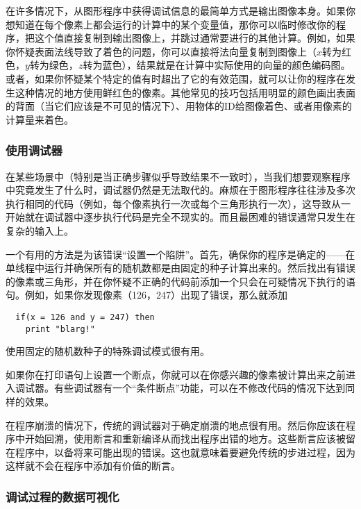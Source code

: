 \documentclass[lang=cn,12pt]{elegantbook}
\begin{document}
在许多情况下，从图形程序中获得调试信息的最简单方式是输出图像本身。如果你想知道在每个像素上都会运行的计算中的某个变量值，那你可以临时修改你的程序，把这个值直接复制到输出图像上，并跳过通常要进行的其他计算。例如，如果你怀疑表面法线导致了着色的问题，你可以直接将法向量复制到图像上（$x$转为红色，$y$转为绿色，$z$转为蓝色），结果就是在计算中实际使用的向量的颜色编码图。或者，如果你怀疑某个特定的值有时超出了它的有效范围，就可以让你的程序在发生这种情况的地方使用鲜红色的像素。其他常见的技巧包括用明显的颜色画出表面的背面（当它们应该是不可见的情况下）、用物体的ID给图像着色、或者用像素的计算量来着色。

\subsubsection{使用调试器}

在某些场景中（特别是当正确步骤似乎导致结果不一致时），当我们想要观察程序中究竟发生了什么时，调试器仍然是无法取代的。麻烦在于图形程序往往涉及多次执行相同的代码（例如，每个像素执行一次或每个三角形执行一次），这导致从一开始就在调试器中逐步执行代码是完全不现实的。而且最困难的错误通常只发生在复杂的输入上。

一个有用的方法是为该错误“设置一个陷阱”。首先，确保你的程序是确定的——在单线程中运行并确保所有的随机数都是由固定的种子计算出来的。然后找出有错误的像素或三角形，并在你怀疑不正确的代码前添加一个只会在可疑情况下执行的语句。例如，如果你发现像素（126，247）出现了错误，那么就添加

\begin{lstlisting}
  if(x = 126 and y = 247) then
    print "blarg!"
\end{lstlisting}

\begin{note}
使用固定的随机数种子的特殊调试模式很有用。
\end{note}

如果你在打印语句上设置一个断点，你就可以在你感兴趣的像素被计算出来之前进入调试器。有些调试器有一个“条件断点”功能，可以在不修改代码的情况下达到同样的效果。

在程序崩溃的情况下，传统的调试器对于确定崩溃的地点很有用。然后你应该在程序中开始回溯，使用断言和重新编译从而找出程序出错的地方。这些断言应该被留在程序中，以备将来可能出现的错误。这也就意味着要避免传统的步进过程，因为这样就不会在程序中添加有价值的断言。

\subsubsection{调试过程的数据可视化}
\end{document}
